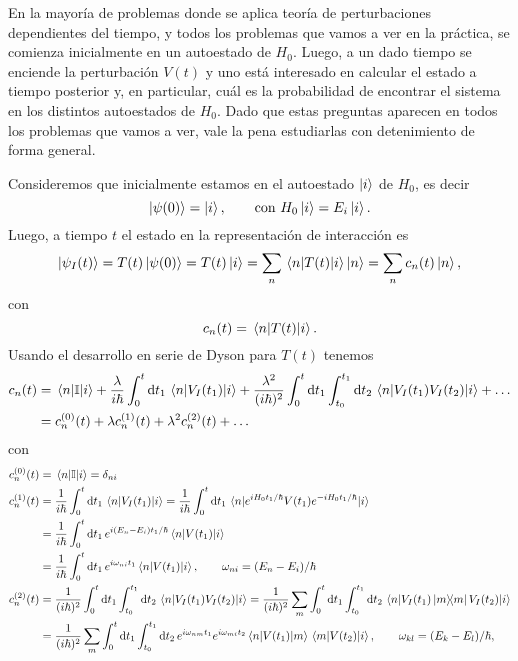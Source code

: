 \documentclass[10pt, a4paper]{article}
\numberwithin{equation}{subsection}
\begin{document}
\bigbreak

En la mayoría de problemas donde se aplica teoría de perturbaciones
dependientes del tiempo, y todos los problemas que vamos a ver en la práctica,
se comienza inicialmente en un autoestado de $H_0$. Luego, a un dado tiempo se
enciende la perturbación $V(t)$ y uno está interesado en calcular el estado a
tiempo posterior y, en particular, cuál es la probabilidad de encontrar el
sistema en los distintos autoestados de $H_0$. Dado que estas preguntas
aparecen en todos los problemas que vamos a ver, vale la pena estudiarlas con
detenimiento de forma general.

Consideremos que inicialmente estamos en el autoestado $\ket{i}$ de $H_0$, es
decir
\begin{equation}
  \ket{\psi(0)} = \ket{i}, \qquad \text{con } H_0\ket{i} = E_i\ket{i}.
\end{equation}
Luego, a tiempo $t$ el estado en la representación de interacción es
\begin{equation} \label{eq:psitintbasish0}
  \ket{\psi_I(t)}
  = T(t)\ket{\psi(0)}
  = T(t)\ket{i}
  = \sum_{n} \matrixel{n}{T(t)}{i} \ket{n}
  = \sum_{n} c_n(t) \ket{n},
\end{equation}
con
\begin{equation}
  c_n(t) = \matrixel{n}{T(t)}{i}.
\end{equation}
Usando el desarrollo en serie de Dyson para $T(t)$ tenemos
\begin{align}
  c_n(t)
  &= \matrixel{n}{\Id}{i} + \frac{\lambda}{i\hbar} \int_{0}^{t}\dd{t_1}
    \matrixel{n}{V_I(t_1)}{i} + \frac{\lambda^2}{(i\hbar)^2}
    \int_{0}^{t}\dd{t_1} \int_{t_0}^{t_1}\dd{t_2}
    \matrixel{n}{V_I(t_1)V_I(t_2)}{i} + \dots \\
  &= c_n^{(0)}(t) + \lambda c_n^{(1)}(t) + \lambda^2 c_n^{(2)}(t) + \dots
\end{align}
con
\begin{align}
  c_n^{(0)}(t)
  &= \matrixel{n}{\Id}{i} = \delta_{ni} \label{eq:cnord0} \\
  c_n^{(1)}(t)
  &= \frac{1}{i\hbar} \int_{0}^{t}\dd{t_1}
    \matrixel{n}{V_I(t_1)}{i} 
  = \frac{1}{i\hbar} \int_{0}^{t}\dd{t_1}
    \matrixel{n}{e^{iH_0t_1/\hbar}V(t_1)e^{-iH_0t_1/\hbar}}{i}  \nonumber \\
  &= \frac{1}{i\hbar} \int_{0}^{t}\dd{t_1} e^{i(E_n-E_i)t_1/\hbar}
    \matrixel{n}{V(t_1)}{i} \nonumber \\
  &= \frac{1}{i\hbar} \int_{0}^{t}\dd{t_1} e^{i\omega_{ni}t_1}
    \matrixel{n}{V(t_1)}{i}, \qquad \omega_{ni} = (E_n - E_i)/\hbar
    \label{eq:cnord1} \\
  c_n^{(2)}(t)
  &= \frac{1}{(i\hbar)^2} \int_{0}^{t}\dd{t_1} \int_{t_0}^{t_1}\dd{t_2}
    \matrixel{n}{V_I(t_1)V_I(t_2)}{i} 
  = \frac{1}{(i\hbar)^2} \sum_{m}\int_{0}^{t}\dd{t_1} \int_{t_0}^{t_1}\dd{t_2}
    \matrixel{n}{V_I(t_1)\projector{m}V_I(t_2)}{i} \nonumber \\
  &= \frac{1}{(i\hbar)^2} \sum_{m}\int_{0}^{t}\dd{t_1} \int_{t_0}^{t_1}\dd{t_2}
    e^{i\omega_{nm}t_1} e^{i\omega_{mi}t_2}
    \matrixel{n}{V(t_1)}{m}\matrixel{m}{V(t_2)}{i},
    \qquad \omega_{kl} = (E_k - E_l)/\hbar, \label{eq:cnord2}
\end{align}
\end{document}
